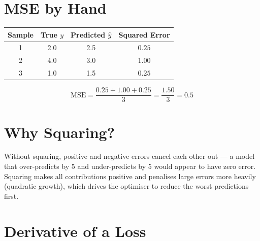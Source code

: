 \documentclass[11pt, a4paper]{article}
\begin{document}

\renewcommand{\sectionprefix}{Question}

\section{MSE by Hand}

\begin{tcolorbox}[solutionbox]

\begin{center}
\begin{tabular}{cccc}
\toprule
Sample & True $y$ & Predicted $\hat{y}$ & Squared Error \\
\midrule
1 & 2.0 & 2.5 & $0.25$ \\
2 & 4.0 & 3.0 & $1.00$ \\
3 & 1.0 & 1.5 & $0.25$ \\
\bottomrule
\end{tabular}
\end{center}

\begin{tcolorbox}[answerbox]
$$\text{MSE} = \frac{0.25 + 1.00 + 0.25}{3} = \frac{1.50}{3} = 0.5$$
\end{tcolorbox}

\end{tcolorbox}

\section{Why Squaring?}

\begin{tcolorbox}[solutionbox]
Without squaring, positive and negative errors cancel each other out — a model
that over-predicts by 5 and under-predicts by 5 would appear to have zero error.
Squaring makes all contributions positive and penalises large errors more heavily
(quadratic growth), which drives the optimiser to reduce the worst predictions first.
\end{tcolorbox}

\section{Derivative of a Loss}
\end{document}
